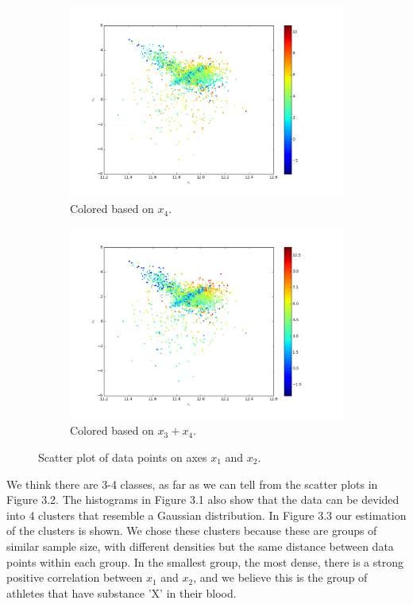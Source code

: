 \documentclass[a4paper,10pt]{article}
\numberwithin{equation}{section} %
\numberwithin{figure}{section} %
\numberwithin{table}{section} %
\theoremstyle{mytheor}
\begin{document}
\begin{enumerate}
\begin{figure}[h!]
\begin{subfigure}[b]{0.45\textwidth}
				\includegraphics[width=\textwidth]{scatter_x4.png}\vspace{-0.5cm}
				\caption{Colored based on $x_4$.}
			\end{subfigure}
			\begin{subfigure}[b]{0.45\textwidth}
				\includegraphics[width=\textwidth]{scatter_x3plusx4.png}\vspace{-0.5cm}
				\caption{Colored based on $x_3 + x_4$.}
			\end{subfigure}
   			\caption{\vspace{-0.1cm} Scatter plot of data points on axes $x_1$ and $x_2$.}\vspace{-0.2cm}
  		\end{figure}
		We think there are 3-4 classes, as far as we can tell from the scatter plots in Figure 3.2. The histograms in Figure 3.1 also show that the data can be devided into 4 clusters that resemble a Gaussian distribution. In Figure 3.3 our estimation of the clusters is shown. We chose these clusters because these are groups of similar sample size, with different densities but the same distance between data points within each group. In the smallest group, the most dense, there is a strong positive correlation between $x_1$ and $x_2$, and we believe this is the group of athletes that have substance 'X' in their blood.

\end{enumerate}
\end{document}
